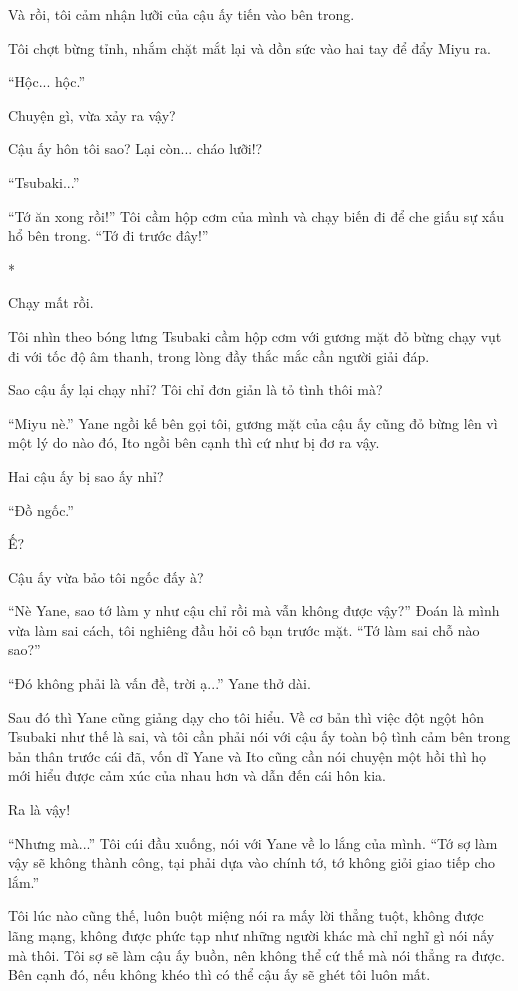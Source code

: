{Và rồi, tôi cảm nhận lưỡi của cậu ấy tiến vào bên trong.

Tôi chợt bừng tỉnh, nhắm chặt mắt lại và dồn sức vào hai tay để đẩy Miyu
ra.

``Hộc... hộc.''

Chuyện gì, vừa xảy ra vậy?

Cậu ấy hôn tôi sao? Lại còn... cháo lưỡi!?

``Tsubaki...''

``Tớ ăn xong rồi!'' Tôi cầm hộp cơm của mình và chạy biến đi để che giấu
sự xấu hổ bên trong. ``Tớ đi trước đây!''

*

Chạy mất rồi.

Tôi nhìn theo bóng lưng Tsubaki cầm hộp cơm với gương mặt đỏ bừng chạy
vụt đi với tốc độ âm thanh, trong lòng đầy thắc mắc cần người giải đáp.

Sao cậu ấy lại chạy nhỉ? Tôi chỉ đơn giản là tỏ tình thôi mà?

``Miyu nè.'' Yane ngồi kế bên gọi tôi, gương mặt của cậu ấy cũng đỏ bừng
lên vì một lý do nào đó, Ito ngồi bên cạnh thì cứ như bị đơ ra vậy.

Hai cậu ấy bị sao ấy nhỉ?

``Đồ ngốc.''

Ế?

Cậu ấy vừa bảo tôi ngốc đấy à?

``Nè Yane, sao tớ làm y như cậu chỉ rồi mà vẫn không được vậy?'' Đoán là
mình vừa làm sai cách, tôi nghiêng đầu hỏi cô bạn trước mặt. ``Tớ làm
sai chỗ nào sao?''

``Đó không phải là vấn đề, trời ạ...'' Yane thở dài.

Sau đó thì Yane cũng giảng dạy cho tôi hiểu. Về cơ bản thì việc đột ngột
hôn Tsubaki như thế là sai, và tôi cần phải nói với cậu ấy toàn bộ tình
cảm bên trong bản thân trước cái đã, vốn dĩ Yane và Ito cũng cần nói
chuyện một hồi thì họ mới hiểu được cảm xúc của nhau hơn và dẫn đến cái
hôn kia.

Ra là vậy!

``Nhưng mà...'' Tôi cúi đầu xuống, nói với Yane về lo lắng của mình.
``Tớ sợ làm vậy sẽ không thành công, tại phải dựa vào chính tớ, tớ không
giỏi giao tiếp cho lắm.''

Tôi lúc nào cũng thế, luôn buột miệng nói ra mấy lời thẳng tuột, không
được lãng mạng, không được phức tạp như những người khác mà chỉ nghĩ gì
nói nấy mà thôi. Tôi sợ sẽ làm cậu ấy buồn, nên không thể cứ thế mà nói
thẳng ra được. Bên cạnh đó, nếu không khéo thì có thể cậu ấy sẽ ghét tôi
luôn mất.

}
